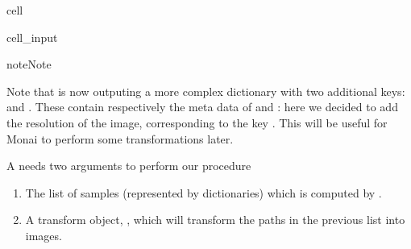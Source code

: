 \documentclass[letterpaper,10pt,english]{jupyterBook}
\begin{document}
\begin{sphinxuseclass}{cell}
\begin{sphinxVerbatimInput}
\begin{sphinxuseclass}{cell_input}
\end{sphinxuseclass}\end{sphinxVerbatimInput}

\end{sphinxuseclass}
\begin{sphinxadmonition}{note}{Note}

\sphinxAtStartPar
Note that  is now outputing a more complex dictionary with two additional keys:  and . These contain respectively the meta data of  and : here we decided to add the resolution of the image, corresponding to the key . This will be useful for Monai to perform some transformations later.
\end{sphinxadmonition}

\sphinxAtStartPar
A  needs two arguments to perform our procedure
\begin{enumerate}
%
\item {} 
\sphinxAtStartPar
The list of samples (represented by dictionaries) which is computed by .

\item {} 
\sphinxAtStartPar
A transform object, , which will transform the paths in the previous list into images.

\end{enumerate}
\end{document}
